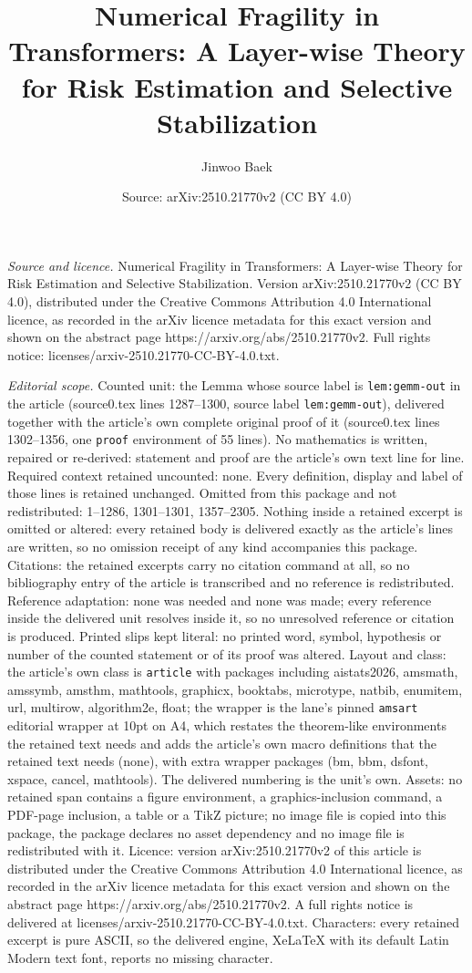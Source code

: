 \documentclass[10pt,a4paper]{amsart}
\title[Numerical Fragility in Transformers: A Layer-wise Theory for]{Numerical Fragility in Transformers: A Layer-wise Theory for Risk Estimation and Selective Stabilization}
\author{Jinwoo Baek}
\date{Source: arXiv:2510.21770v2 (CC BY 4.0)}
\begin{document}
\maketitle

\noindent\emph{Source and licence.} Numerical Fragility in Transformers: A Layer-wise Theory for Risk Estimation and Selective Stabilization. Version arXiv:2510.21770v2 (CC BY 4.0), distributed under the Creative Commons Attribution 4.0 International licence, as recorded in the arXiv licence metadata for this exact version and shown on the abstract page https://arxiv.org/abs/2510.21770v2. Full rights notice: licenses/arxiv-2510.21770-CC-BY-4.0.txt.\par\smallskip

\noindent\textit{Editorial scope.} Counted unit: the Lemma whose source label is \texttt{lem:gemm-out} in the article (source0.tex lines 1287--1300, source label \texttt{lem:gemm-out}), delivered together with the article's own complete original proof of it (source0.tex lines 1302--1356, one \texttt{proof} environment of 55 lines). No mathematics is written, repaired or re-derived: statement and proof are the article's own text line for line. Required context retained uncounted: none. Every definition, display and label of those lines is retained unchanged. Omitted from this package and not redistributed: 1--1286, 1301--1301, 1357--2305. Nothing inside a retained excerpt is omitted or altered: every retained body is delivered exactly as the article's lines are written, so no omission receipt of any kind accompanies this package. Citations: the retained excerpts carry no citation command at all, so no bibliography entry of the article is transcribed and no reference is redistributed. Reference adaptation: none was needed and none was made; every reference inside the delivered unit resolves inside it, so no unresolved reference or citation is produced. Printed slips kept literal: no printed word, symbol, hypothesis or number of the counted statement or of its proof was altered. Layout and class: the article's own class is \texttt{article} with packages including aistats2026, amsmath, amssymb, amsthm, mathtools, graphicx, booktabs, microtype, natbib, enumitem, url, multirow, algorithm2e, float; the wrapper is the lane's pinned \texttt{amsart} editorial wrapper at 10pt on A4, which restates the theorem-like environments the retained text needs and adds the article's own macro definitions that the retained text needs (none), with extra wrapper packages (bm, bbm, dsfont, xspace, cancel, mathtools). The delivered numbering is the unit's own. Assets: no retained span contains a figure environment, a graphics-inclusion command, a PDF-page inclusion, a table or a TikZ picture; no image file is copied into this package, the package declares no asset dependency and no image file is redistributed with it. Licence: version arXiv:2510.21770v2 of this article is distributed under the Creative Commons Attribution 4.0 International licence, as recorded in the arXiv licence metadata for this exact version and shown on the abstract page https://arxiv.org/abs/2510.21770v2. A full rights notice is delivered at licenses/arxiv-2510.21770-CC-BY-4.0.txt. Characters: every retained excerpt is pure ASCII, so the delivered engine, XeLaTeX with its default Latin Modern text font, reports no missing character.
\end{document}
